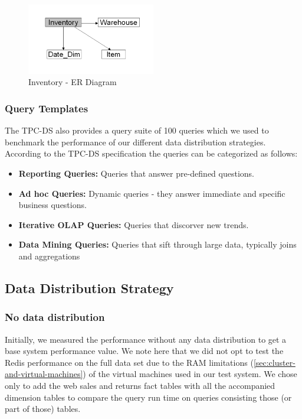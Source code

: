 \documentclass[conference]{IEEEtran}
\begin{document}
\begin{figure}[h]
    \centering
    \includegraphics[width=0.5\textwidth]{images/ER_Diagrams/Inventory - ER Diagram.png}
    \caption{Inventory - ER Diagram}
    \label{fig:inventory_er_diagram}
\end{figure}

\subsubsection{Query Templates}

The TPC-DS also provides a query suite of 100 queries which we used to benchmark the performance of our different data distribution strategies. According to the TPC-DS specification \cite{b8} the queries can be categorized as follows:

\begin{itemize}
    \item \textbf{Reporting Queries:} Queries that answer pre-defined questions.
    \item \textbf{Ad hoc Queries:}  Dynamic queries - they answer immediate and specific business questions.
    \item \textbf{Iterative OLAP Queries:}  Queries that discorver new trends.
    \item \textbf{Data Mining Queries:}  Queries that sift through large data, typically joins and aggregations
\end{itemize}

\subsection{Data Distribution Strategy}

\subsubsection{No data distribution}

Initially, we measured the performance without any data distribution to get a base system performance value. We note here that we did not opt to test the Redis performance on the full data set due to the RAM limitations (\ref{sec:cluster-and-virtual-machines}) of the virtual machines used in our test system. We chose only to add the web sales and returns fact tables with all the accompanied dimension tables to compare the query run time on queries consisting those (or part of those) tables.
\end{document}
